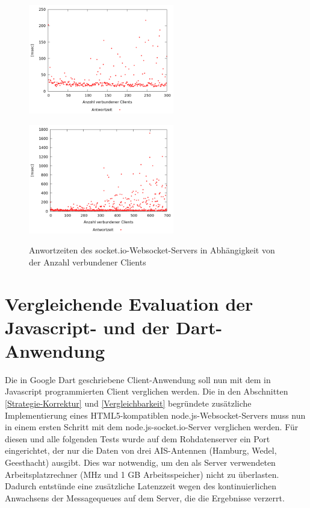 \begin{figure}[H]
\begin{minipage}[hbt]{3in}
	\centering
	\includegraphics[width=2.5in]{images/stresstest300.png}
	\label{Stresstest300}
\end{minipage}
\hfill
\begin{minipage}[hbt]{3in}
	\centering
	\includegraphics[width=2.5in]{images/stresstest.png}
	\label{Stresstest}
\end{minipage}
\caption{Anwortzeiten des socket.io-Websocket-Servers in Abhängigkeit von der Anzahl verbundener Clients}
\end{figure}
\section{Vergleichende Evaluation der Javascript- und der Dart-Anwendung}
Die in Google Dart geschriebene Client-Anwendung soll nun mit dem in Javascript programmierten Client verglichen werden. Die in den Abschnitten  \ref{Strategie-Korrektur} und \ref{Vergleichbarkeit} begründete zusätzliche Implementierung eines HTML5-kompatiblen node.js-Websocket-Servers muss nun in einem ersten Schritt mit dem node.js-socket.io-Server verglichen werden. Für diesen und alle folgenden Tests wurde auf dem Rohdatenserver ein Port eingerichtet, der nur die Daten von drei AIS-Antennen (Hamburg, Wedel, Geesthacht) ausgibt. Dies war notwendig, um den als Server verwendeten Arbeitsplatzrechner (MHz und 1 GB Arbeitsspeicher) nicht zu überlasten. Dadurch entstünde eine zusätzliche Latenzzeit wegen des kontinuierlichen Anwachsens der Messagequeues auf dem Server, die die Ergebnisse verzerrt.
